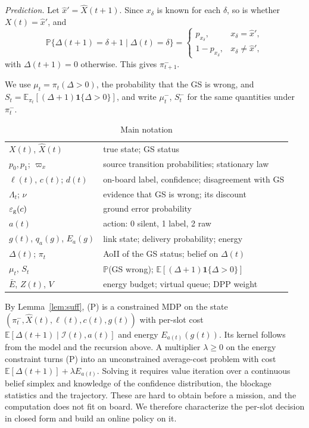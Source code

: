 \documentclass[conference]{IEEEtran}
\theoremstyle{remark}
\newcommand{\E}{\mathbb{E}}
\newcommand{\Prob}{\mathbb{P}}
\newcommand{\ind}[1]{\mathbf{1}\{#1\}}
\newcommand{\I}{\mathcal{I}}
\newcommand{\lab}{\ell}
\newcommand{\ee}{\varepsilon}
\newcommand{\xh}{\hat{x}}
\begin{document}
\emph{Prediction.} Let $\xh'=\hat X(t+1)$. Since $x_\delta$ is known for each $\delta$, so is whether $X(t)=\xh'$, and
\begin{equation}\label{eq:pred}
\Prob\big\{\Delta(t+1)=\delta+1\mid\Delta(t)=\delta\big\}=\begin{cases}p_{x_\delta}, & x_\delta=\xh',\\ 1-p_{x_\delta}, & x_\delta\neq\xh',\end{cases}
\end{equation}
with $\Delta(t+1)=0$ otherwise. This gives $\pi^-_{t+1}$.

We use $\mu_t=\pi_t(\Delta>0)$, the probability that the GS is wrong, and $S_t=\E_{\pi_t}[(\Delta+1)\ind{\Delta>0}]$, and write $\mu^-_t$, $S^-_t$ for the same quantities under $\pi^-_t$.

\begin{table}[t]
\caption{Main notation}\label{tab:notation}
\centering\footnotesize
\begin{tabular}{@{}ll@{}}
\toprule
$X(t)$, $\hat X(t)$ & true state; GS status \\
$p_0,p_1$; $\varpi_x$ & source transition probabilities; stationary law \\
$\lab(t)$, $c(t)$; $d(t)$ & on-board label, confidence; disagreement with GS \\
$\Lambda_t$; $\nu$ & evidence that GS is wrong; its discount \\
$\ee_{\rm g}(c)$ & ground error probability \\
$a(t)$ & action: 0 silent, 1 label, 2 raw \\
$g(t)$, $q_a(g)$, $E_a(g)$ & link state; delivery probability; energy \\
$\Delta(t)$; $\pi_t$ & AoII of the GS status; belief on $\Delta(t)$ \\
$\mu_t$, $S_t$ & $\Prob$(GS wrong); $\E[(\Delta{+}1)\ind{\Delta>0}]$ \\
$\bar E$, $Z(t)$, $V$ & energy budget; virtual queue; DPP weight \\
\bottomrule
\end{tabular}
\end{table}

By Lemma~\ref{lem:suff}, (P) is a constrained MDP on the state $(\pi^-_t,\hat X(t),\lab(t),c(t),g(t))$ with per-slot cost $\E[\Delta(t+1)\mid\I(t),a(t)]$ and energy $E_{a(t)}(g(t))$. Its kernel follows from the model and the recursion above. A multiplier $\lambda\ge0$ on the energy constraint turns (P) into an unconstrained average-cost problem with cost $\E[\Delta(t+1)]+\lambda E_{a(t)}$. Solving it requires value iteration over a continuous belief simplex and knowledge of the confidence distribution, the blockage statistics and the trajectory. These are hard to obtain before a mission, and the computation does not fit on board. We therefore characterize the per-slot decision in closed form and build an online policy on it.
\end{document}
